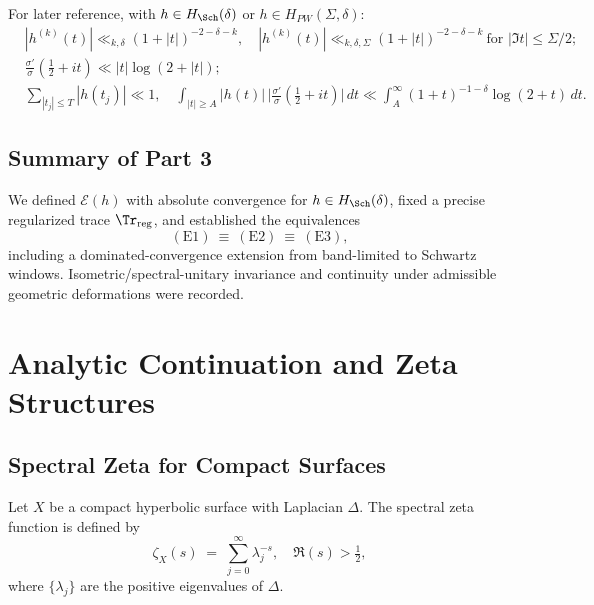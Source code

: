 For later reference, with $h\in H_{\Sch}(\delta)$ or $h\in H_{PW}(\Sigma,\delta)$:
\begin{align*}
  & |h^{(k)}(t)| \ll_{k,\delta} (1+|t|)^{-2-\delta-k},\quad
    |h^{(k)}(t)| \ll_{k,\delta,\Sigma} (1+|t|)^{-2-\delta-k}\ \text{for } |\Im t|\le \Sigma/2;\\
  & \frac{\sigma'}{\sigma}\!\left(\tfrac12+it\right) \ll |t|\log(2+|t|);\\
  & \sum_{|t_j|\le T} |h(t_j)| \ll 1,\quad
    \int_{|t|\ge A} |h(t)|\,\Big|\tfrac{\sigma'}{\sigma}(\tfrac12+it)\Big|\,dt
      \ll \int_A^\infty (1+t)^{-1-\delta}\log(2+t)\,dt.
\end{align*}

\subsection{Summary of Part 3}
\label{subsec:part3-summary}

\noindent
We defined $\mathcal{E}(h)$ with absolute convergence for $h\in H_{\Sch}(\delta)$, fixed a precise
regularized trace $\Tr_{\mathrm{reg}}$, and established the equivalences
\[
  \mathrm{(E1)}\ \equiv\ \mathrm{(E2)}\ \equiv\ \mathrm{(E3)},
\]
including a dominated-convergence extension from band-limited to Schwartz windows.
Isometric/spectral-unitary invariance and continuity under admissible geometric deformations were recorded.


\section{Analytic Continuation and Zeta Structures}
\label{sec:analytic-continuation}

\subsection{Spectral Zeta for Compact Surfaces}
\label{subsec:compact-zeta}

\begin{definition}
\label{def:spectral-zeta-compact}
Let $X$ be a compact hyperbolic surface with Laplacian $\Delta$.
The spectral zeta function is defined by
\[
\zeta_X(s) \;=\; \sum_{j=0}^\infty \lambda_j^{-s},
\quad \Re(s)>\tfrac{1}{2},
\]
where $\{\lambda_j\}$ are the positive eigenvalues of $\Delta$.
\end{definition}

